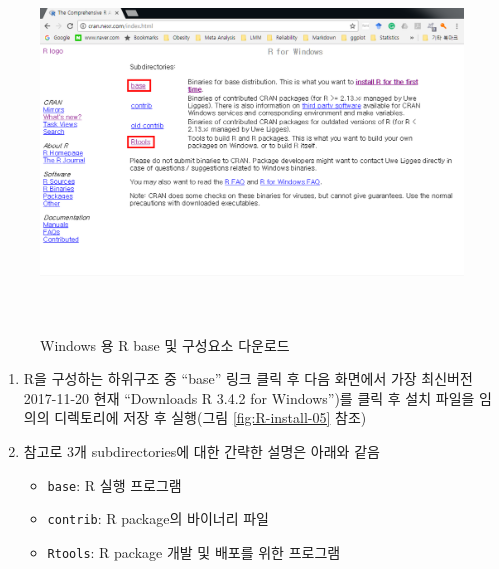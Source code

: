 \documentclass[11pt,a4paper]{book}
\providecommand{\tightlist}{%
  \setlength{\itemsep}{0pt}\setlength{\parskip}{0pt}}
\theoremstyle{definition}
\theoremstyle{definition}
\theoremstyle{definition}
\theoremstyle{remark}
\begin{document}
\begin{figure}[H]
{
  \centering
  \includegraphics[width = 12cm, height = 10cm]{Figures/Rinstall-02.png}
  \caption[Windows 용 R base 및 구성요소 다운로드]{Windows 용 R base 및 구성요소 다운로드}\label{fig:R-install-04}
}
\end{figure}

\begin{enumerate}
\def\labelenumi{\arabic{enumi}.}
\setcounter{enumi}{5}
\item
  R을 구성하는 하위구조 중 ``base'' 링크 클릭 후 다음 화면에서 가장
  최신버전2017-11-20 현재 ``Downloads R 3.4.2 for Windows'')를 클릭 후
  설치 파일을 임의의 디렉토리에 저장 후 실행(그림 \ref{fig:R-install-05}
  참조)
\item
  참고로 3개 subdirectories에 대한 간략한 설명은 아래와 같음

  \begin{itemize}
  \tightlist
  \item
    \texttt{base}: R 실행 프로그램
  \item
    \texttt{contrib}: R package의 바이너리 파일
  \item
    \texttt{Rtools}: R package 개발 및 배포를 위한 프로그램
  \end{itemize}
\end{enumerate}
\end{document}
